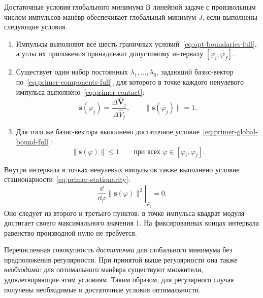 \begin{explanation}{Достаточные условия глобального минимума}
В линейной задаче с произвольным числом импульсов манёвр
обеспечивает глобальный минимум $J$, если выполнены следующие условия.
\begin{enumerate}[leftmargin=*,label=\arabic*)]
 \item Импульсы выполняют все шесть граничных
 условий~\eqref{eq:opt-boundaries-full}, а углы их приложения принадлежат
 допустимому интервалу $[\varphi_i,\varphi_f]$.
 \item Существует один набор постоянных
 $\lambda_1,\ldots,\lambda_6$, задающий базис-вектор
 по~\eqref{eq:primer-components-full}, для которого в точке
 каждого ненулевого импульса выполнено~\eqref{eq:primer-contact}:
 \[
  \boldsymbol s(\varphi_j)
     =\frac{\Delta\widehat{\boldsymbol V}_j}{\Delta\widehat V_j},
  \qquad \|\boldsymbol s(\varphi_j)\|=1.
 \]
 \item Для того же базис-вектора выполнено достаточное
 условие~\eqref{eq:primer-global-bound-full}:
 \[
  \|\boldsymbol s(\varphi)\|\leq1
  \qquad\text{при всех }\varphi\in[\varphi_i,\varphi_f].
 \]
\end{enumerate}
Внутри интервала в точках ненулевых импульсов также выполнено
условие стационарности~\eqref{eq:primer-stationarity}:
\[
 \left.\frac{\dd}{\dd\varphi}\|\boldsymbol s(\varphi)\|^2
          \right|_{\varphi_j}=0.
\]
Оно следует из второго и третьего пунктов: в точке импульса
квадрат модуля достигает своего максимального значения $1$.
На фиксированных концах интервала равенство производной нулю
не требуется.

Перечисленная совокупность \emph{достаточна} для глобального
минимума без предположения регулярности. При принятой выше
регулярности она также \emph{необходима}: для оптимального
манёвра существуют множители, удовлетворяющие этим условиям.
Таким образом, для регулярного случая получены необходимые
и достаточные условия оптимальности.
\end{explanation}
